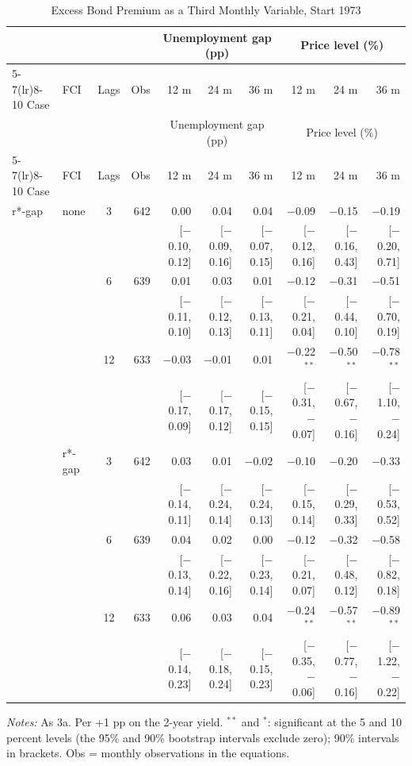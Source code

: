 \begingroup\scriptsize\setlength{\tabcolsep}{0.9pt}
\begin{longtable}{llcrrrrrrr}
\caption{Excess Bond Premium as a Third Monthly Variable, Start 1973}\label{tab:appR3b}\\
\toprule
 & & & & \multicolumn{3}{c}{Unemployment gap (pp)} & \multicolumn{3}{c}{Price level (\%)}\\ \cmidrule(lr){5-7}\cmidrule(lr){8-10}
Case & FCI & Lags & Obs & 12 m & 24 m & 36 m & 12 m & 24 m & 36 m\\
\midrule\endfirsthead
\toprule
 & & & & \multicolumn{3}{c}{Unemployment gap (pp)} & \multicolumn{3}{c}{Price level (\%)}\\ \cmidrule(lr){5-7}\cmidrule(lr){8-10}
Case & FCI & Lags & Obs & 12 m & 24 m & 36 m & 12 m & 24 m & 36 m\\
\midrule\endhead
\bottomrule\endfoot
r*-gap & none & 3 & 642 & 0.00 & 0.04 & 0.04 & $-$0.09 & $-$0.15 & $-$0.19\\
 & & & & {\scriptsize [$-$0.10, 0.12]} & {\scriptsize [$-$0.09, 0.16]} & {\scriptsize [$-$0.07, 0.15]} & {\scriptsize [$-$0.12, 0.16]} & {\scriptsize [$-$0.16, 0.43]} & {\scriptsize [$-$0.20, 0.71]}\\
 &  & 6 & 639 & 0.01 & 0.03 & 0.01 & $-$0.12 & $-$0.31 & $-$0.51\\
 & & & & {\scriptsize [$-$0.11, 0.10]} & {\scriptsize [$-$0.12, 0.13]} & {\scriptsize [$-$0.13, 0.11]} & {\scriptsize [$-$0.21, 0.04]} & {\scriptsize [$-$0.44, 0.10]} & {\scriptsize [$-$0.70, 0.19]}\\
 &  & 12 & 633 & $-$0.03 & $-$0.01 & 0.01 & $-$0.22$^{**}$ & $-$0.50$^{**}$ & $-$0.78$^{**}$\\
 & & & & {\scriptsize [$-$0.17, 0.09]} & {\scriptsize [$-$0.17, 0.12]} & {\scriptsize [$-$0.15, 0.15]} & {\scriptsize [$-$0.31, $-$0.07]} & {\scriptsize [$-$0.67, $-$0.16]} & {\scriptsize [$-$1.10, $-$0.24]}\\
 & r*-gap & 3 & 642 & 0.03 & 0.01 & $-$0.02 & $-$0.10 & $-$0.20 & $-$0.33\\
 & & & & {\scriptsize [$-$0.14, 0.11]} & {\scriptsize [$-$0.24, 0.14]} & {\scriptsize [$-$0.24, 0.13]} & {\scriptsize [$-$0.15, 0.14]} & {\scriptsize [$-$0.29, 0.33]} & {\scriptsize [$-$0.53, 0.52]}\\
 &  & 6 & 639 & 0.04 & 0.02 & 0.00 & $-$0.12 & $-$0.32 & $-$0.58\\
 & & & & {\scriptsize [$-$0.13, 0.14]} & {\scriptsize [$-$0.22, 0.16]} & {\scriptsize [$-$0.23, 0.14]} & {\scriptsize [$-$0.21, 0.07]} & {\scriptsize [$-$0.48, 0.12]} & {\scriptsize [$-$0.82, 0.18]}\\
 &  & 12 & 633 & 0.06 & 0.03 & 0.04 & $-$0.24$^{**}$ & $-$0.57$^{**}$ & $-$0.89$^{**}$\\
 & & & & {\scriptsize [$-$0.14, 0.23]} & {\scriptsize [$-$0.18, 0.24]} & {\scriptsize [$-$0.15, 0.23]} & {\scriptsize [$-$0.35, $-$0.06]} & {\scriptsize [$-$0.77, $-$0.16]} & {\scriptsize [$-$1.22, $-$0.22]}\\
\end{longtable}
\begin{flushleft}\footnotesize\textit{Notes:} As 3a. Per +1 pp on the 2-year yield. $^{**}$ and $^{*}$: significant at the 5 and 10 percent levels (the 95\% and 90\% bootstrap intervals exclude zero); 90\% intervals in brackets. Obs = monthly observations in the equations.\end{flushleft}
\endgroup
